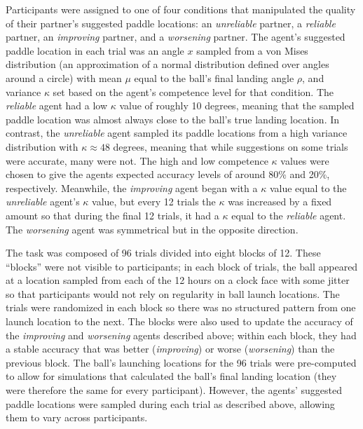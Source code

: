 \documentclass[10pt,letterpaper]{article}
\begin{document}

Participants were assigned to one of four conditions that manipulated the quality of their partner's suggested paddle locations: an \textit{unreliable} partner, a \textit{reliable} partner, an \textit{improving} partner, and a \textit{worsening} partner. The agent's
suggested paddle location in each trial was an angle $x$ sampled from a von Mises distribution (an approximation of a normal distribution defined over angles around a circle) with mean $\mu$ equal to the ball's final landing angle $\rho$, and variance $\kappa$ set based on the agent's competence level for that condition. The \textit{reliable} agent had a low $\kappa$ value of roughly 10 degrees, meaning that the sampled paddle location was almost always close to the ball's true landing location. In contrast, the \textit{unreliable} agent sampled its paddle locations from a high variance distribution with $\kappa \approx 48$ degrees, meaning that while suggestions on some trials were accurate, many were not. The high and low competence $\kappa$ values were chosen to give the agents expected accuracy levels of around 80\% and 20\%, respectively. Meanwhile, the \textit{improving} agent began with a $\kappa$ value equal to the \textit{unreliable} agent's $\kappa$ value, but every 12 trials the $\kappa$ was increased by a fixed amount so that during the final 12 trials, it had a $\kappa$ equal to the \textit{reliable} agent. The \textit{worsening} agent was symmetrical but in the opposite direction.

The task was composed of 96 trials divided into eight blocks of 12. These ``blocks'' were not visible to participants; in each block of trials, the ball appeared at a location sampled from each of the 12 hours on a clock face with some jitter so that participants would not rely on regularity in ball launch locations. The trials were randomized in each block so there was no structured pattern from one launch location to the next. The blocks were also used to update the accuracy of the \textit{improving} and \textit{worsening} agents described above; within each block, they had a stable accuracy that was better (\textit{improving}) or worse (\textit{worsening}) than the previous block. The ball's launching locations for the 96 trials were pre-computed to allow for simulations that calculated the ball's final landing location (they were therefore the same for every participant). However, the agents' suggested paddle locations were sampled during each trial as described above, allowing them to vary across participants. 
\end{document}

